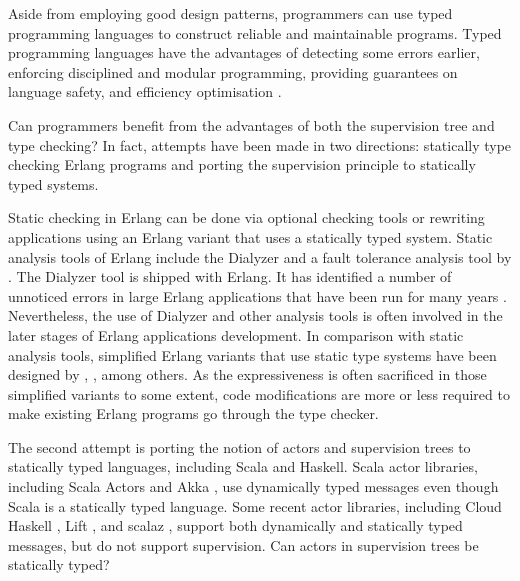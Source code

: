 Aside from employing good design patterns, programmers can use typed 
programming languages to construct reliable and maintainable 
programs.  Typed programming languages have the advantages of detecting some 
errors earlier, enforcing disciplined and modular programming, providing 
guarantees on language safety, and efficiency optimisation \citep{TPL}.

Can programmers benefit from the advantages of both the 
supervision tree and type checking?  In fact, attempts have been made in two 
directions: statically type checking Erlang programs and porting the 
supervision principle to statically typed systems.

Static checking in Erlang can be done via optional checking tools or 
rewriting applications using an Erlang variant that uses a statically typed 
system.  Static analysis tools of Erlang include the Dialyzer \citep{Dialyzer} 
and a fault tolerance analysis tool by \citet{JanHenry}.  The Dialyzer tool is 
shipped with Erlang.  It has identified a number of unnoticed errors in large 
Erlang applications that have been run for many years 
\citep{DialyzerDetecting}. Nevertheless, the use of Dialyzer and other 
analysis tools is often involved in the later stages of Erlang applications 
development.  In comparison with static analysis tools, simplified Erlang 
variants that use static type systems have been designed by 
\citet{marlow1997practical}, \citet{sabelfeld2002securing}, among others.  As 
the expressiveness is often sacrificed in those simplified variants to some 
extent, code modifications are more or less required to make existing 
Erlang programs go through the type checker.

The second attempt is porting the notion of actors and supervision trees to 
statically typed languages, including Scala and Haskell.  Scala actor 
libraries, 
including Scala Actors \citep{actor_1, actor_2} and Akka 
\citep{akka_api,akka_doc}, use 
dynamically typed messages even though Scala is a statically typed language.  
Some recent actor libraries, including Cloud Haskell \citep{CloudHaskell}, Lift 
\citep{lift_scala}, and scalaz \citep{scalaz}, support both 
dynamically and statically typed messages, but do not support supervision.  Can 
actors in supervision trees be statically typed? 

